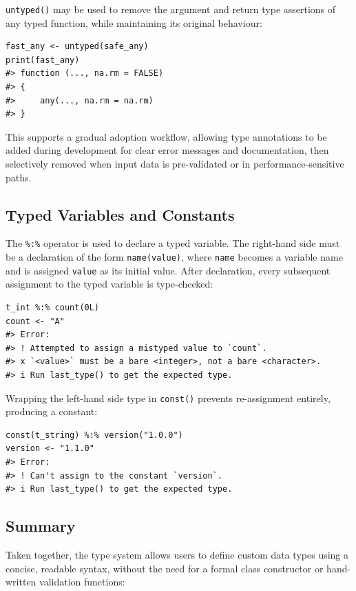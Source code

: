 \texttt{untyped()} may be used to remove the argument and return type assertions of any typed function, while maintaining its original behaviour:

\begin{verbatim}
fast_any <- untyped(safe_any)
print(fast_any)
#> function (..., na.rm = FALSE) 
#> {
#>     any(..., na.rm = na.rm)
#> }
\end{verbatim}

This supports a gradual adoption workflow, allowing type annotations to be added during development for clear error messages and documentation, then selectively removed when input data is pre-validated or in performance-sensitive paths.

\subsection{Typed Variables and Constants}\label{sec-typed-variables}

The \texttt{\%:\%} operator is used to declare a typed variable. The right-hand side must be a declaration of the form \texttt{name(value)}, where \texttt{name} becomes a variable name and is assigned \texttt{value} as its initial value. After declaration, every subsequent assignment to the typed variable is type-checked:

\begin{verbatim}
t_int %:% count(0L)
count <- "A"
#> Error:
#> ! Attempted to assign a mistyped value to `count`.
#> x `<value>` must be a bare <integer>, not a bare <character>.
#> i Run last_type() to get the expected type.
\end{verbatim}

Wrapping the left-hand side type in \texttt{const()} prevents re-assignment entirely, producing a constant:

\begin{verbatim}
const(t_string) %:% version("1.0.0")
version <- "1.1.0"
#> Error:
#> ! Can't assign to the constant `version`.
#> i Run last_type() to get the expected type.
\end{verbatim}

\subsection{Summary}\label{sec-type-summary}

Taken together, the type system allows users to define custom data types using a concise, readable syntax, without the need for a formal class constructor or hand-written validation functions:

